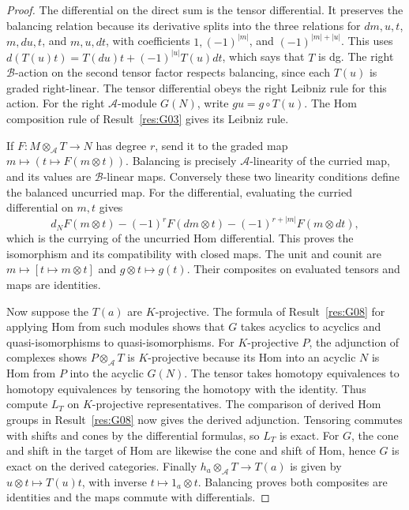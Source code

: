 \documentclass[11pt,oneside,openany]{book}
\theoremstyle{definition}
\theoremstyle{remark}
\begin{document}
\begin{proof}
The differential on the direct sum is the tensor differential.
It preserves the balancing relation because its derivative splits
into the three relations for \(dm,u,t\), \(m,du,t\), and \(m,u,dt\),
with coefficients \(1,(-1)^{|m|}\), and \((-1)^{|m|+|u|}\).
This uses
\(d(T(u)t)=T(du)t+(-1)^{|u|}T(u)dt\), which says that \(T\) is dg.
The right \(\mathcal B\)-action on the second tensor factor
respects balancing, since each \(T(u)\) is graded right-linear.
The tensor differential obeys the right Leibniz rule for this
action. For the right \(\mathcal A\)-module \(G(N)\), write
\(g u=g\circ T(u)\). The Hom composition rule of
Result~\ref{res:G03} gives its Leibniz rule.

If \(F:M\otimes_\mathcal A T\to N\) has degree \(r\), send it to
the graded map \(m\mapsto (t\mapsto F(m\otimes t))\). Balancing
is precisely \(\mathcal A\)-linearity of the curried map, and its
values are \(\mathcal B\)-linear maps. Conversely these two
linearity conditions define the balanced uncurried map.
For the differential, evaluating the curried differential
on \(m,t\) gives
\[
 d_N F(m\otimes t)-(-1)^r F(dm\otimes t)
       -(-1)^{r+|m|}F(m\otimes dt),
\]
which is the currying of the uncurried Hom differential.
This proves the isomorphism and its compatibility with closed
maps. The unit and counit are \(m\mapsto[t\mapsto m\otimes t]\)
and \(g\otimes t\mapsto g(t)\). Their composites on evaluated
tensors and maps are identities.

Now suppose the \(T(a)\) are \(K\)-projective. The formula of
Result~\ref{res:G08} for applying Hom from such modules shows
that \(G\) takes acyclics to acyclics and quasi-isomorphisms to
quasi-isomorphisms. For \(K\)-projective \(P\), the adjunction
of complexes shows \(P\otimes_\mathcal A T\) is \(K\)-projective
because its Hom into an acyclic \(N\) is Hom from \(P\) into the
acyclic \(G(N)\). The tensor takes homotopy equivalences to
homotopy equivalences by tensoring the homotopy with the identity.
Thus compute \(L_T\) on \(K\)-projective representatives.
The comparison of derived Hom groups in Result~\ref{res:G08}
now gives the derived adjunction. Tensoring commutes with shifts
and cones by the differential formulas, so \(L_T\) is exact.
For \(G\), the cone and shift in the target of Hom are likewise
the cone and shift of Hom, hence \(G\) is exact on the derived
categories. Finally \(h_a\otimes_\mathcal A T\to T(a)\) is
given by \(u\otimes t\mapsto T(u)t\), with inverse
\(t\mapsto 1_a\otimes t\). Balancing proves both composites are
identities and the maps commute with differentials.
\end{proof}
\end{document}
